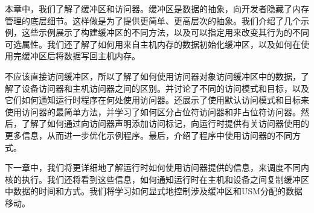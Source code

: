 本章中，我们了解了缓冲区和访问器。缓冲区是数据的抽象，向开发者隐藏了内存管理的底层细节。这样做是为了提供更简单、更高层次的抽象。我们介绍了几个示例，这些示例展示了构建缓冲区的不同方法，以及可以指定用来改变其行为的不同可选属性。我们还了解了如何用来自主机内存的数据初始化缓冲区，以及如何在使用完缓冲区后将数据写回主机内存。\par

不应该直接访问缓冲区，所以了解了如何使用访问器对象访问缓冲区中的数据，了解了设备访问器和主机访问器之间的区别。并讨论了不同的访问模式和目标，以及它们如何通知运行时程序在何处使用访问器。还展示了使用默认访问模式和目标来使用访问器的最简单方法，并学习了如何区分占位符访问器和非占位符访问器。然后，了解了如何通过向访问器声明添加访问标记，向运行时提供有关访问器使用的更多信息，从而进一步优化示例程序。最后，介绍了程序中使用访问器的不同方式。\par

下一章中，我们将更详细地了解运行时如何使用访问器提供的信息，来调度不同内核的执行。我们还将看到这些信息，如何通知运行时在主机和设备之间复制缓冲区中数据的时间和方式。我们将学习如何显式地控制涉及缓冲区和USM分配的数据移动。\par

\newpage